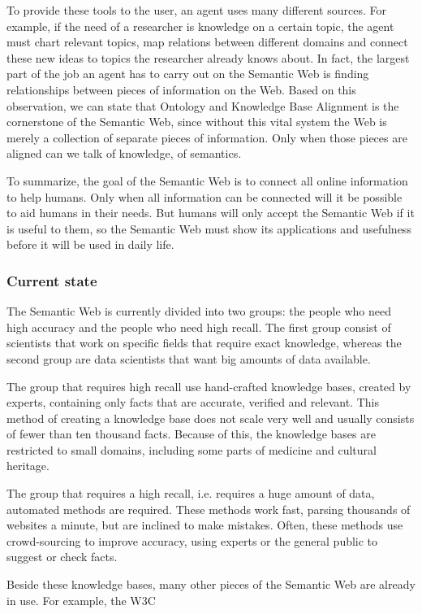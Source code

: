 \documentclass{article}
\begin{document}
 To provide these tools to the user, an agent uses many different sources. For example, if the need of a researcher is knowledge on a certain topic, the agent must chart relevant topics, map relations between different domains and connect these new ideas to topics the researcher already knows about. In fact, the largest part of the job an agent has to carry out on the Semantic Web is finding relationships between pieces of information on the Web. Based on this observation, we can state that Ontology and Knowledge Base Alignment is the cornerstone  of the Semantic Web, since without this vital system the Web is merely a collection of separate pieces of information. Only when those pieces are aligned can we talk of knowledge, of semantics.
 
 To summarize, the goal of the Semantic Web is to connect all online information to help humans. Only when all information can be connected will it be possible to aid humans in their needs. But humans will only accept the Semantic Web if it is useful to them, so the Semantic Web must show its applications and usefulness before it will be used in daily life.
 \subsubsection{Current state}
 The Semantic Web is currently divided into two groups: the people who need high accuracy and the people who need high recall. The first group consist of scientists that work on specific fields that require exact knowledge, whereas the second group are data scientists that want big amounts of data available.
 
 The group that requires high recall use hand-crafted knowledge bases, created by experts, containing only facts that are accurate, verified and relevant. This method of creating a knowledge base does not scale very well and usually consists of fewer than ten thousand facts. Because of this, the knowledge bases are restricted to small domains, including some parts of medicine and cultural heritage. \cite{byrne, le2002}
 
 The group that requires a high recall, i.e. requires a huge amount of data, automated methods are required. These methods work fast, parsing thousands of websites a minute, but are inclined to make mistakes. Often, these methods use crowd-sourcing to improve accuracy, using experts or the general public to suggest or check facts. \cite{zhou2007}
 
 Beside these knowledge bases, many other pieces of the Semantic Web are already in use. For example, the W3C \cite{rdf, owl}
 
\end{document}
